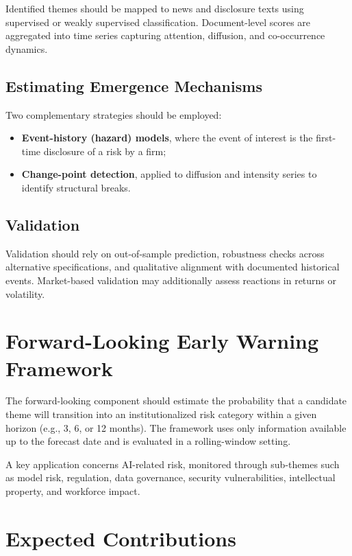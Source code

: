 \documentclass[11pt,a4paper]{article}
\begin{document}
Identified themes should be mapped to news and disclosure texts using supervised or weakly supervised classification. Document-level scores are aggregated into time series capturing attention, diffusion, and co-occurrence dynamics.

\subsection{Estimating Emergence Mechanisms}

Two complementary strategies should be employed:
\begin{itemize}
\item \textbf{Event-history (hazard) models}, where the event of interest is the first-time disclosure of a risk by a firm;
\item \textbf{Change-point detection}, applied to diffusion and intensity series to identify structural breaks.
\end{itemize}

\subsection{Validation}

Validation should rely on out-of-sample prediction, robustness checks across alternative specifications, and qualitative alignment with documented historical events. Market-based validation may additionally assess reactions in returns or volatility.

\section{Forward-Looking Early Warning Framework}

The forward-looking component should estimate the probability that a candidate theme will transition into an institutionalized risk category within a given horizon (e.g., 3, 6, or 12 months). The framework uses only information available up to the forecast date and is evaluated in a rolling-window setting.

A key application concerns AI-related risk, monitored through sub-themes such as model risk, regulation, data governance, security vulnerabilities, intellectual property, and workforce impact.

\section{Expected Contributions}
\end{document}
